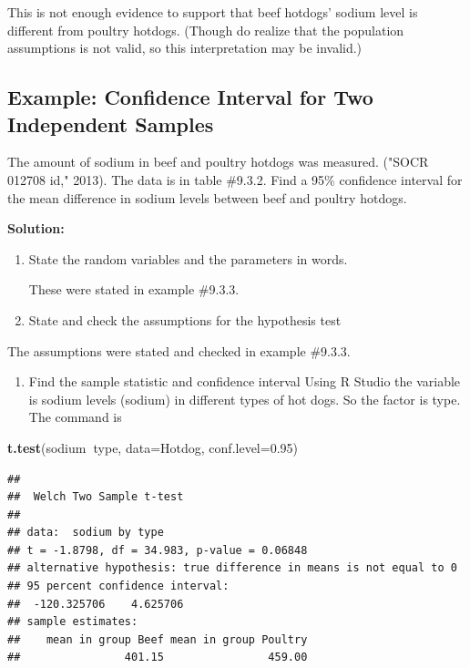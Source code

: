 \documentclass[
]{book}
\newenvironment{Shaded}{\begin{snugshade}}{\end{snugshade}}
\newcommand{\DataTypeTok}[1]{\textcolor[rgb]{0.13,0.29,0.53}{#1}}
\newcommand{\FloatTok}[1]{\textcolor[rgb]{0.00,0.00,0.81}{#1}}
\newcommand{\KeywordTok}[1]{\textcolor[rgb]{0.13,0.29,0.53}{\textbf{#1}}}
\newcommand{\NormalTok}[1]{#1}
\newcommand{\OperatorTok}[1]{\textcolor[rgb]{0.81,0.36,0.00}{\textbf{#1}}}
\providecommand{\tightlist}{%
  \setlength{\itemsep}{0pt}\setlength{\parskip}{0pt}}
\begin{document}
This is not enough evidence to support that beef hotdogs' sodium level is different from poultry hotdogs. (Though do realize that the population assumptions is not valid, so this interpretation may be invalid.)

\hypertarget{example-confidence-interval-for-two-independent-samples}{%
\subsection{Example: Confidence Interval for Two Independent Samples}\label{example-confidence-interval-for-two-independent-samples}}

The amount of sodium in beef and poultry hotdogs was measured. ("SOCR 012708 id," 2013). The data is in table \#9.3.2. Find a 95\% confidence interval for the mean difference in sodium levels between beef and poultry hotdogs.

\textbf{Solution:}

\begin{enumerate}
\def\labelenumi{\arabic{enumi}.}
\item
  State the random variables and the parameters in words.

  These were stated in example \#9.3.3.
\item
  State and check the assumptions for the hypothesis test
\end{enumerate}

The assumptions were stated and checked in example \#9.3.3.

\begin{enumerate}
\def\labelenumi{\arabic{enumi}.}
\setcounter{enumi}{2}
\tightlist
\item
  Find the sample statistic and confidence interval
  Using R Studio the variable is sodium levels (sodium) in different types of hot dogs. So the factor is type. The command is
\end{enumerate}

\begin{Shaded}
\begin{Highlighting}[]
\KeywordTok{t.test}\NormalTok{(sodium}\OperatorTok{~}\NormalTok{type, }\DataTypeTok{data=}\NormalTok{Hotdog, }\DataTypeTok{conf.level=}\FloatTok{0.95}\NormalTok{)}
\end{Highlighting}
\end{Shaded}

\begin{verbatim}
## 
## 	Welch Two Sample t-test
## 
## data:  sodium by type
## t = -1.8798, df = 34.983, p-value = 0.06848
## alternative hypothesis: true difference in means is not equal to 0
## 95 percent confidence interval:
##  -120.325706    4.625706
## sample estimates:
##    mean in group Beef mean in group Poultry 
##                401.15                459.00
\end{verbatim}
\end{document}
